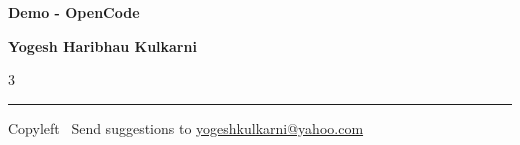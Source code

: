 \documentclass[8pt,landscape]{article}
\begin{document}
\footnotesize


\begin{center}
{\Large{\textbf{Demo - OpenCode}}}  

\textbf{Yogesh Haribhau Kulkarni}
\end{center}

\begin{multicols}{3}

\end{multicols}

\rule{\linewidth}{0.25pt}
\scriptsize
Copyleft \textcopyleft\  Send suggestions to 
\href{http://www.yogeshkulkarni.com}{yogeshkulkarni@yahoo.com}
\end{document}
